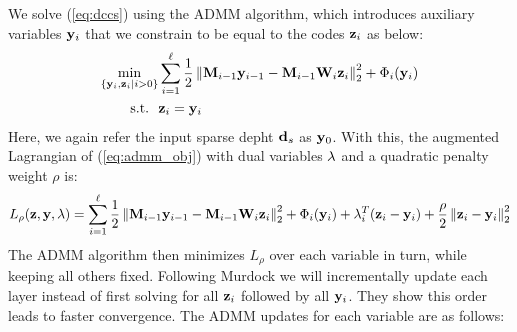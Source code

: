 We solve (\ref{eq:dccs}) using the ADMM algorithm, which introduces auxiliary variables $\mathbf{y}_i$ that we constrain to be equal to the codes $\mathbf{z}_i$ as below:
\begin{equation}
\begin{aligned}
\min_{\{\mathbf{y}_i, \mathbf{z}_i \vert i>0\}} & \sum_{i=1}^{\ell} \frac{1}{2} \left\Vert \mathbf{M}_{i-1}\mathbf{y}_{i-1} - \mathbf{M}_{i-1}\mathbf{W}_i\mathbf{z}_i\right\Vert_2^2 + \Phi_i(\mathbf{y}_i)\\
\text{s.t.~~} & \mathbf{z}_i = \mathbf{y}_i
\end{aligned}
\label{eq:admm_obj}
\end{equation}
Here, we again refer the input sparse depht $\mathbf{d}_s$ as $\mathbf{y}_0$. With this, the augmented Lagrangian of (\ref{eq:admm_obj}) with dual variables $\bold{\lambda}$ and a quadratic penalty weight $\rho$ is:
\begin{equation}
  L_\rho(\mathbf{z}, \mathbf{y}, \mathbf{\lambda}) = \sum_{i=1}^{\ell} \frac{1}{2} \left\Vert \mathbf{M}_{i-1}\mathbf{y}_{i-1} - \mathbf{M}_{i-1}\mathbf{W}_i\mathbf{z}_i\right\Vert_2^2 + \Phi_i(\mathbf{y}_i) + \mathbf{\lambda}^T_i(\mathbf{z}_i - \mathbf{y}_i) + \frac{\rho}{2}\left\Vert\mathbf{z}_i - \mathbf{y}_i\right\Vert_2^2
\end{equation}
The ADMM algorithm then minimizes $L_\rho$ over each variable in turn, while keeping all others fixed. Following Murdock \etal we will incrementally update each layer instead of first solving for all $\mathbf{z}_i$ followed by all $\mathbf{y}_i$. They show this order leads to faster convergence. The ADMM updates for each variable are as follows:

